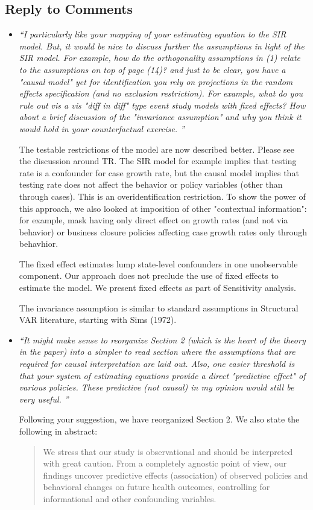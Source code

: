 \documentclass[11pt]{article}
\begin{document}
\subsection*{Reply to Comments}
\begin{itemize}

\item   \textit{``I particularly like your mapping of your estimating equation to the SIR model. But, it would be nice to discuss further the assumptions in light of the SIR model. For example, how do the orthogonality assumptions in (1) relate to the assumptions on top of page (14)? and just to be clear, you have a "causal model" yet for identification you rely on projections in the random effects specification (and no exclusion restriction). For example, what do you rule out vis a vis "diff in diff" type event study models with fixed effects? How about a brief discussion of the "invariance assumption" and why you think it would hold in your counterfactual exercise. ''}

The testable restrictions of the model are now described better.  Please see the discussion around TR. The SIR model
for example implies that testing rate is a confounder for case growth rate, but the causal model implies  that testing rate
does not affect the behavior or policy variables (other than through cases). This is an overidentification restriction.
To show the power of this approach, we also looked at imposition of other "contextual information": for example, mask
having only direct effect on growth rates (and not via behavior) or business closure policies affecting case growth rates
only through behavhior.

The fixed effect estimates lump state-level confounders in one unobservable component.  Our approach does not preclude
the use of fixed effects to estimate the model. We present fixed effects as part of Sensitivity analysis.

The invariance assumption is similar to standard assumptions in Structural VAR literature, starting with Sims (1972).



\item   \textit{``It might make sense to reorganize Section 2 (which is the heart of the theory in the paper) into a simpler to read section  where the assumptions that are required for causal interpretation are laid out. Also, one easier threshold is that your system of estimating equations provide a direct "predictive effect" of various policies. These predictive (not causal) in my opinion would still be very useful. ''}

Following your suggestion, we have reorganized Section 2. 
 We also state the following in abstract:
 \begin{quote}
 We stress that our study is observational and should be interpreted with great caution. 
 From a completely agnostic point of view,
our findings uncover predictive effects (association) of observed policies and behavioral changes  on future health outcomes,
 controlling for informational and other confounding variables.
\end{quote}

\end{itemize}
\end{document}
